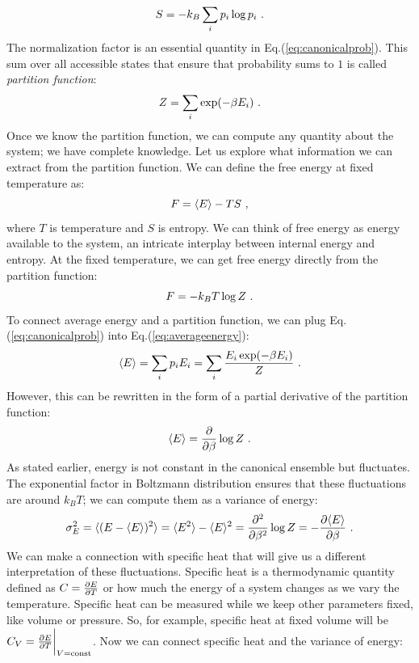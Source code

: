 \begin{equation}
	S = -k_B \sum_i p_i \log p_i \ .
\end{equation} 
The normalization factor is an essential quantity in Eq.(\ref{eq:canonicalprob}). This sum over all accessible states that ensure that probability sums to $1$ is called \textit{partition function}:
\begin{equation}
	Z = \sum_i \exp(-\beta E_i) \ .
\end{equation}
Once we know the partition function, we can compute any quantity about the system; we have complete knowledge. Let us explore what information we can extract from the partition function. We can define the free energy at fixed temperature as:
\begin{equation}
	F = \langle E \rangle - TS \ ,
\end{equation}
where $T$ is temperature and $S$ is entropy. We can think of free energy as energy available to the system, an intricate interplay between internal energy and entropy. At the fixed temperature, we can get free energy directly from the partition function:
\begin{equation}
	F = -k_B T \log Z \ .
\end{equation}
To connect average energy and a partition function, we can plug Eq.(\ref{eq:canonicalprob}) into Eq.(\ref{eq:averageenergy}):
\begin{equation*}
	\langle E \rangle = \sum_i p_i E_i = \sum_i \frac{E_i \exp(-\beta E_i)}{Z} \ .
\end{equation*}
However, this can be rewritten in the form of a partial derivative of the partition function:
\begin{equation}
	\langle E \rangle = \pdv{\beta} \log Z \ .
\end{equation}
As stated earlier, energy is not constant in the canonical ensemble but fluctuates. The exponential factor in Boltzmann distribution ensures that these fluctuations are around $k_B T$; we can compute them as a variance of energy:
\begin{equation*}
	\sigma^2_E = \langle (E - \langle E \rangle)^2 \rangle = \langle E^2 \rangle - \langle E \rangle^2 = \pdv[2]{\beta} \log Z = - \pdv{\langle E \rangle}{\beta} \ .
\end{equation*} 
We can make a connection with specific heat that will give us a different interpretation of these fluctuations. Specific heat is a thermodynamic quantity defined as $C = \pdv{E}{T}$ or how much the energy of a system changes as we vary the temperature. Specific heat can be measured while we keep other parameters fixed, like volume or pressure. So, for example, specific heat at fixed volume will be $C_V = \pdv{E}{T}\bigg\rvert_{V=\text{const}}$. Now we can connect specific heat and the variance of energy:
